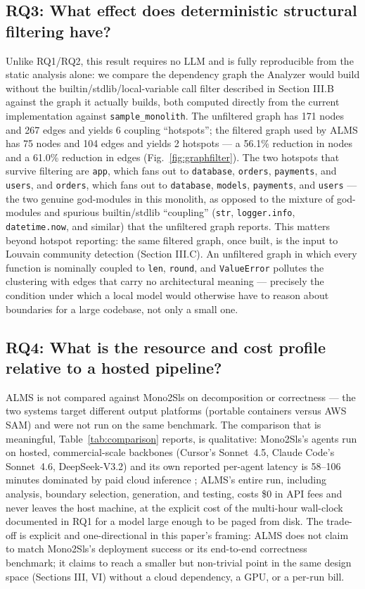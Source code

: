 \documentclass[conference]{IEEEtran}
\begin{document}
\subsection{RQ3: What effect does deterministic structural filtering have?}

Unlike RQ1/RQ2, this result requires no LLM and is fully reproducible from the static analysis alone: we compare the dependency graph the Analyzer would build without the builtin/stdlib/local-variable call filter described in Section III.B against the graph it actually builds, both computed directly from the current implementation against \texttt{sample\_monolith}. The unfiltered graph has 171 nodes and 267 edges and yields 6 coupling ``hotspots''; the filtered graph used by ALMS has 75 nodes and 104 edges and yields 2 hotspots --- a 56.1\% reduction in nodes and a 61.0\% reduction in edges (Fig.~\ref{fig:graphfilter}). The two hotspots that survive filtering are \texttt{app}, which fans out to \texttt{database}, \texttt{orders}, \texttt{payments}, and \texttt{users}, and \texttt{orders}, which fans out to \texttt{database}, \texttt{models}, \texttt{payments}, and \texttt{users} --- the two genuine god-modules in this monolith, as opposed to the mixture of god-modules and spurious builtin/stdlib ``coupling'' (\texttt{str}, \texttt{logger.info}, \texttt{datetime.now}, and similar) that the unfiltered graph reports. This matters beyond hotspot reporting: the same filtered graph, once built, is the input to Louvain community detection (Section III.C). An unfiltered graph in which every function is nominally coupled to \texttt{len}, \texttt{round}, and \texttt{ValueError} pollutes the clustering with edges that carry no architectural meaning --- precisely the condition under which a local model would otherwise have to reason about boundaries for a large codebase, not only a small one.

\subsection{RQ4: What is the resource and cost profile relative to a hosted pipeline?}

ALMS is not compared against Mono2Sls \cite{chen2026} on decomposition or correctness --- the two systems target different output platforms (portable containers versus AWS SAM) and were not run on the same benchmark. The comparison that is meaningful, Table~\ref{tab:comparison} reports, is qualitative: Mono2Sls's agents run on hosted, commercial-scale backbones (Cursor's Sonnet~4.5, Claude Code's Sonnet~4.6, DeepSeek-V3.2) and its own reported per-agent latency is 58--106 minutes dominated by paid cloud inference \cite{chen2026}; ALMS's entire run, including analysis, boundary selection, generation, and testing, costs \$0 in API fees and never leaves the host machine, at the explicit cost of the multi-hour wall-clock documented in RQ1 for a model large enough to be paged from disk. The trade-off is explicit and one-directional in this paper's framing: ALMS does not claim to match Mono2Sls's deployment success or its end-to-end correctness benchmark; it claims to reach a smaller but non-trivial point in the same design space (Sections III, VI) without a cloud dependency, a GPU, or a per-run bill.
\end{document}
